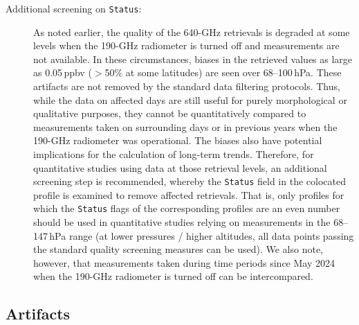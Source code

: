 \begin{nofloatpages}
\begin{description}
  \item[Additional screening on  \texttt{Status}:] As noted earlier, the quality of the \mbox{640\nobreakdash-GHz}  retrievals is degraded at some levels when the \mbox{190\nobreakdash-GHz} radiometer is turned off and  measurements are not available. In these circumstances, biases in the retrieved  values as large as 0.05\,ppbv ($>$50\% at some latitudes) are seen over 68--100\,hPa. These artifacts are not removed by the standard  data filtering protocols. Thus, while the  data on affected days are still useful for purely morphological or qualitative purposes, they cannot be quantitatively compared to measurements taken on surrounding days or in previous years when the \mbox{190\nobreakdash-GHz} radiometer was operational. The biases also have potential implications for the calculation of long-term trends. Therefore, for quantitative studies using  data at those retrieval levels, an additional screening step is recommended, whereby the \texttt{Status} field in the colocated  profile is examined to remove affected  retrievals. That is, only  profiles for which the \texttt{Status} flags of the corresponding  profiles are an even number should be used in quantitative studies relying on  measurements in the 68--147\,hPa range (at lower pressures / higher altitudes, all  data points passing the standard quality screening measures can be used). We also note, however, that measurements taken during time periods since May 2024 when the \mbox{190\nobreakdash-GHz} radiometer is turned off can be intercompared.      
\end{description}
\end{nofloatpages}

\subsection{Artifacts}
\label{sec:ClOArtifacts}

